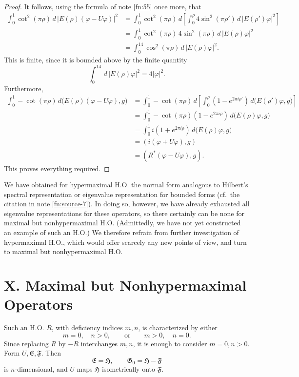 ﻿\documentclass[paper=b5,fontsize=13pt,bookmarkpackage=false,twoside]{scrartcl}
\begin{document}
\begin{proof}
It follows, using the formula of note \ref{fn:55} once more, that
\begin{align*}
\int_0^1\cot^2(\pi\rho)\,
d\,|E(\rho)(\varphi-U\varphi)|^2
&=
\int_0^1\cot^2(\pi\rho)\,
d\left[
\int_0^\rho4\sin^2(\pi\rho')\,d\,|E(\rho')\varphi|^2
\right]\\
&=
\int_0^1\cot^2(\pi\rho)\,4\sin^2(\pi\rho)\,
d\,|E(\rho)\varphi|^2\\
&=
\int_0^14\cos^2(\pi\rho)\,d\,|E(\rho)\varphi|^2.
\end{align*}
This is finite, since it is bounded above by the finite quantity
\[
\int_0^14\,d\,|E(\rho)\varphi|^2=4|\varphi|^2.
\]
Furthermore,
\begin{align*}
\int_0^1\!-\cot(\pi\rho)\,
d\bigl(E(\rho)(\varphi-U\varphi),g\bigr)
&=
\int_0^1-\cot(\pi\rho)\,
d\left[
\int_0^\rho(1-e^{2\pi i\rho'})\,
d\bigl(E(\rho')\varphi,g\bigr)
\right]\\
&=
\int_0^1\!-\cot(\pi\rho)(1-e^{2\pi i\rho})\,
d\bigl(E(\rho)\varphi,g\bigr)\\
&=
\int_0^1i(1+e^{2\pi i\rho})\,
d\bigl(E(\rho)\varphi,g\bigr)\\
&=(i(\varphi+U\varphi),g)\\
&=(R^*(\varphi-U\varphi),g).
\end{align*}
This proves everything required.
\end{proof}

We have obtained for hypermaximal H.O. the normal form analogous to Hilbert's spectral representation or eigenvalue representation for bounded forms (cf.\ the citation in note \ref{fn:source-7}). In doing so, however, we have already exhausted all eigenvalue representations for these operators, so there certainly can be none for maximal but nonhypermaximal H.O. (Admittedly, we have not yet constructed an example of such an H.O.) We therefore refrain from further investigation of hypermaximal H.O., which would offer scarcely any new points of view, and turn to maximal but nonhypermaximal H.O.

\section*{X. Maximal but Nonhypermaximal Operators}\label{chap:X}

Such an H.O. $R$, with deficiency indices $m,n$, is characterized by either
\[
m=0,\quad n>0,
\qquad\text{or}\qquad
m>0,\quad n=0.
\]
Since replacing $R$ by $-R$ interchanges $m,n$, it is enough to consider $m=0,n>0$. Form $U,\mathfrak E,\mathfrak F$. Then
\[
\mathfrak E=\mathfrak H,
\qquad
\mathfrak G_0=\mathfrak H-\mathfrak F
\]
is $n$-dimensional, and $U$ maps $\mathfrak H$ isometrically onto $\mathfrak F$.
\end{document}
